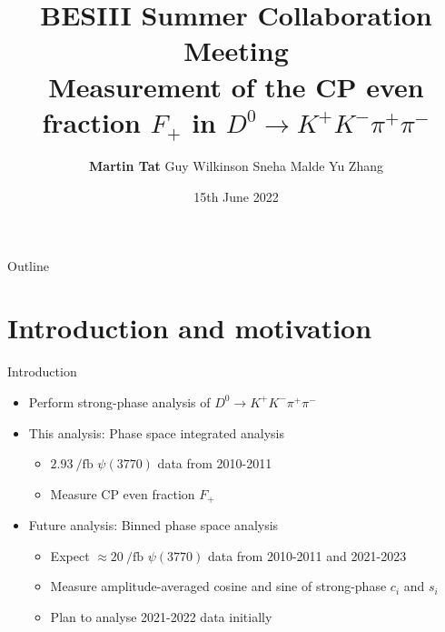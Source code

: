 \documentclass{beamer}
\title[University of Oxford]{BESIII Summer Collaboration Meeting \\Measurement of the CP even fraction \texorpdfstring{$F_+$}{F+} in \texorpdfstring{$D^0\to K^+K^-\pi^+\pi^-$}{D2KKpipi}}
\author[Martin Tat]{\textbf{Martin Tat} \hspace{0.54em} Guy Wilkinson \hspace{0.54em} Sneha Malde \hspace{0.54em} Yu Zhang}
\institute{University of Oxford}
\date{15th June 2022}
\begin{document}
\begin{frame}
  \titlepage
\end{frame}

\begin{frame}{Outline}
  \tableofcontents
\end{frame}

\section{Introduction and motivation}

\begin{frame}{Introduction}
  \begin{itemize}
    \setlength\itemsep{1.5em}
    \item{Perform strong-phase analysis of $D^0\to K^+K^-\pi^+\pi^-$}
    \item{This analysis: Phase space integrated analysis}
    \begin{itemize}
      \item{$\SI{2.93}{\per\femto\barn}$ $\psi(3770)$ data from 2010-2011}
      \item{Measure CP even fraction $F_+$}
    \end{itemize}
    \item{Future analysis: Binned phase space analysis}
    \begin{itemize}
      \item{Expect $\approx\SI{20}{\per\femto\barn}$ $\psi(3770)$ data from 2010-2011 and 2021-2023}
      \item{Measure amplitude-averaged cosine and sine of strong-phase $c_i$ and $s_i$}
      \item{Plan to analyse 2021-2022 data initially}
    \end{itemize}
  \end{itemize}
\end{frame}
\end{document}
